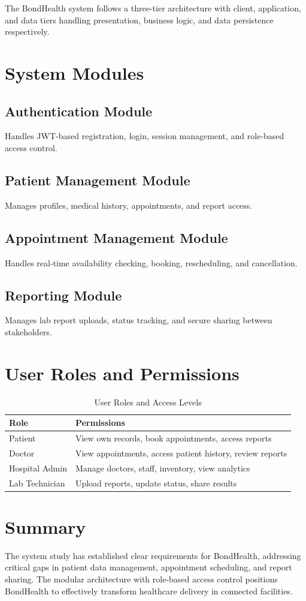 The BondHealth system follows a three-tier architecture with client, application, and data tiers handling presentation, business logic, and data persistence respectively.

\section{System Modules}

\subsection{Authentication Module}
Handles JWT-based registration, login, session management, and role-based access control.

\subsection{Patient Management Module}
Manages profiles, medical history, appointments, and report access.

\subsection{Appointment Management Module}
Handles real-time availability checking, booking, rescheduling, and cancellation.

\subsection{Reporting Module}
Manages lab report uploads, status tracking, and secure sharing between stakeholders.

\section{User Roles and Permissions}

\begin{table}[h]
\centering
\begin{tabular}{|l|l|}
\hline
\textbf{Role} & \textbf{Permissions} \\
\hline
Patient & View own records, book appointments, access reports \\
\hline
Doctor & View appointments, access patient history, review reports \\
\hline
Hospital Admin & Manage doctors, staff, inventory, view analytics \\
\hline
Lab Technician & Upload reports, update status, share results \\
\hline
\end{tabular}
\caption{User Roles and Access Levels}
\label{tab:roles}
\end{table}

\section{Summary}
The system study has established clear requirements for BondHealth, addressing critical gaps in patient data management, appointment scheduling, and report sharing. The modular architecture with role-based access control positions BondHealth to effectively transform healthcare delivery in connected facilities.